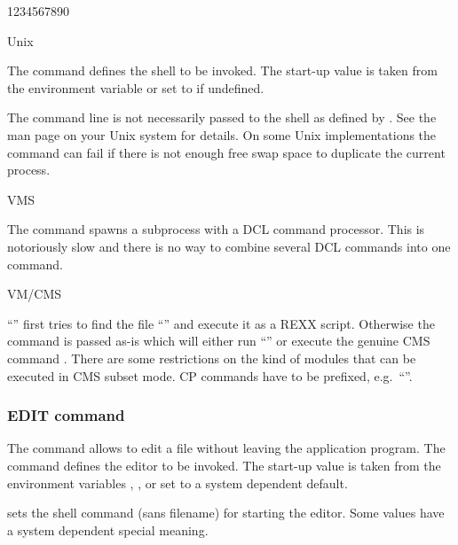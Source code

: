 \begin{DL}{1234567890}
\item[Unix]

The command  defines the shell to be invoked.
The start-up value is taken from the environment variable 
or set to  if undefined.

The command line is not necessarily passed to the shell as
defined by .
See the  man page on your Unix system for details.
On some Unix implementations the  command can fail if
there is not enough free swap space to duplicate the current process.


\item[VMS]

The  command spawns a subprocess with a DCL command processor.
This is notoriously slow and there is no way to combine several DCL
commands into one  command.


\item[VM/CMS]

``''
first tries to find the file ``'' and execute it as a
REXX script.
Otherwise the command is passed as-is which will either run
``'' or execute the genuine CMS command .
There are some restrictions on the kind of modules that can be
executed in CMS subset mode. 
CP commands have to be prefixed, e.g.\
``''.

\end{DL}


\subsubsection{EDIT command}

The  command allows to edit a file without leaving the
application program.
The command  defines the editor to be invoked.
The start-up value is taken from the environment variables
, , or set to a system dependent default.

 sets the shell command (sans filename) for starting
the editor. 
Some values have a system dependent special meaning.


